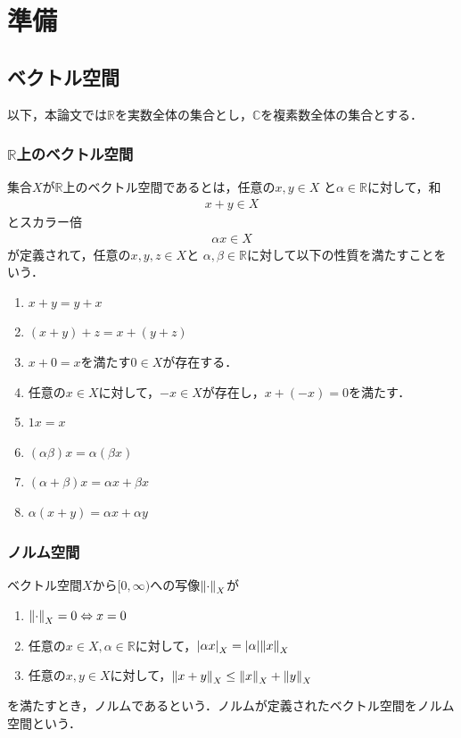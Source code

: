 \chapter{準備}\label{Preparation}
\section{ベクトル空間}
以下，本論文では\(\mathbb{R}\)を実数全体の集合とし，\(\mathbb{C}\)を複素数全体の集合とする．

\subsection{\(\mathbb{R}\)上のベクトル空間}
集合\(X\)が\(\mathbb{R}\)上のベクトル空間であるとは，任意の\(x,y \in X\)
と\(\alpha \in \mathbb{R}\)に対して，和
\begin{align}
    x+y\in X
\end{align}
とスカラー倍
\begin{align}
    \alpha x \in X
\end{align}
が定義されて，任意の\(x,y,z \in X\)と
\(\alpha,\beta \in \mathbb{R}\)に対して以下の性質を満たすことをいう．
\begin{enumerate}[1.]
    \item \( x+y =y+x   \)
    \item \( (x+y)+z =x+(y+z)  \)
    \item \(x+0=x\)を満たす\(0 \in X\)が存在する．
    \item 任意の\(x \in X\)に対して，\(-x \in X\)が存在し，\(x+(-x)=0\)を満たす．
    \item \(1x=x\)
    \item \((\alpha \beta)x=\alpha(\beta x)\)
    \item \((\alpha+\beta)x=\alpha x +\beta x\)
    \item \(\alpha(x+y)=\alpha x+\alpha y\)
\end{enumerate}
\subsection{ノルム空間}
ベクトル空間\(X\)から\([0,\infty)\)への写像\(\norm{\cdot}_X\)が
\begin{enumerate}[1.]
    \item \(\norm{\cdot}_X=0\Leftrightarrow x = 0\)
    \item 任意の\(x \in X,\alpha \in \mathbb{R}\)に対して，\({|\alpha x|}_X={|\alpha|\norm{x}}_X\)
    \item 任意の\(x,y\in X\)に対して，\({\norm{x+y}}_X\leq{\norm{x}}_X+{\norm{y}}_X\)
\end{enumerate}
を満たすとき，ノルムであるという．ノルムが定義されたベクトル空間をノルム空間という．

